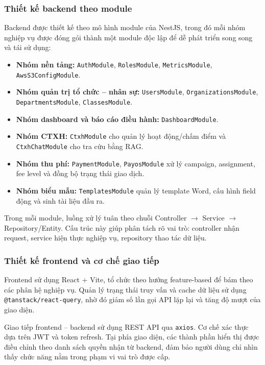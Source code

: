 \subsubsection{Thiết kế backend theo module}
Backend được thiết kế theo mô hình module của NestJS, trong đó mỗi nhóm nghiệp vụ được đóng gói thành một module độc lập để dễ phát triển song song và tái sử dụng:
\begin{itemize}
	\item \textbf{Nhóm nền tảng:} \texttt{AuthModule}, \texttt{RolesModule}, \texttt{MetricsModule}, \texttt{AwsS3ConfigModule}.
	\item \textbf{Nhóm quản trị tổ chức -- nhân sự:} \texttt{UsersModule}, \texttt{OrganizationsModule}, \texttt{DepartmentsModule}, \texttt{ClassesModule}.
	\item \textbf{Nhóm dashboard và báo cáo điều hành:} \texttt{DashboardModule}.
	\item \textbf{Nhóm CTXH:} \texttt{CtxhModule} cho quản lý hoạt động/chấm điểm và \texttt{CtxhChatModule} cho tra cứu bằng RAG.
	\item \textbf{Nhóm thu phí:} \texttt{PaymentModule}, \texttt{PayosModule} xử lý campaign, assignment, fee level và đồng bộ trạng thái giao dịch.
	\item \textbf{Nhóm biểu mẫu:} \texttt{TemplatesModule} quản lý template Word, cấu hình field động và sinh tài liệu đầu ra.
\end{itemize}

Trong mỗi module, luồng xử lý tuân theo chuỗi Controller $\rightarrow$ Service $\rightarrow$ Repository/Entity. Cấu trúc này giúp phân tách rõ vai trò: controller nhận request, service hiện thực nghiệp vụ, repository thao tác dữ liệu.

\subsubsection{Thiết kế frontend và cơ chế giao tiếp}
Frontend sử dụng React + Vite, tổ chức theo hướng feature-based để bám theo các phân hệ nghiệp vụ. Quản lý trạng thái truy vấn và cache dữ liệu sử dụng \texttt{@tanstack/react-query}, nhờ đó giảm số lần gọi API lặp lại và tăng độ mượt của giao diện.

Giao tiếp frontend -- backend sử dụng REST API qua \texttt{axios}. Cơ chế xác thực dựa trên JWT và token refresh. Tại phía giao diện, các thành phần hiển thị được điều chỉnh theo danh sách quyền nhận từ backend, đảm bảo người dùng chỉ nhìn thấy chức năng nằm trong phạm vi vai trò được cấp.

